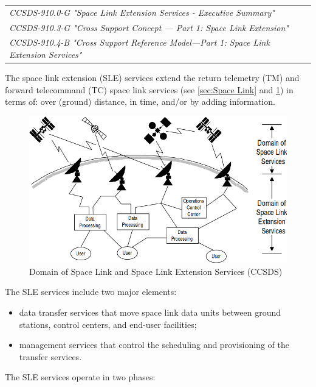 \begin{tabular}{l}
\textit{CCSDS-910.0-G "Space Link Extension Services - Executive Summary" \cite{CCSDS-910.0-G}} \\
\textit{CCSDS-910.3-G "Cross Support Concept — Part 1:  Space Link Extension" \cite{CCSDS-910.3-G}} \\
\textit{CCSDS-910.4-B "Cross Support Reference Model—Part 1: Space Link Extension Services" \cite{CCSDS-910.4-B}} \\
\end{tabular}

The space link extension (SLE) services extend the return telemetry (TM) and forward telecommand (TC) space link services (see \ref{sec:Space Link} and \ref{fig:Domain of Space Link and Space Link Extension Services}) in terms of: over (ground) distance, in time, and/or by adding information.

\begin{figure}[h]
\centering\includegraphics[scale=0.5]{fig/domains_of_space_link_and_space_link_extension_services}
\caption{Domain of Space Link and Space Link Extension Services (CCSDS)}
\label{fig:Domain of Space Link and Space Link Extension Services}
\end{figure}

The SLE services include two major elements:

\begin{itemize}
\item data transfer services that move space link data units between ground stations, control centers, and end-user facilities;
\item management services that control the scheduling and provisioning of the transfer services.
\end{itemize}

The SLE services operate in two phases:

